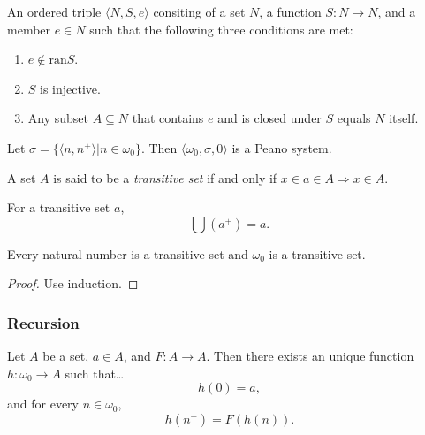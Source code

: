 \label{peanosystem}
An ordered triple $\langle N, S, e \rangle$ consiting of a set $N$, a function $S: N \rightarrow N$, and a member $e \in N$ such that the following three conditions are met:
\begin{enumerate}
  \item $e \not\in \textrm{ran} S$.
  \item $S$ is injective.
  \item Any subset $A \subseteq N$ that contains $e$ and is closed under $S$ equals $N$ itself.
\end{enumerate}

\begin{proposition}
Let $\sigma = \{\langle n, n^+ \rangle | n \in \omega_0\}$. Then $\langle \omega_0, \sigma, 0 \rangle$ is a Peano system.
\end{proposition}

\label{transitiveset}
A set $A$ is said to be a \emph{transitive set} if and only if $x \in a \in A \Rightarrow x \in A$.

\begin{proposition}
For a transitive set $a$,
$$\bigcup(a^+) = a.$$
\end{proposition}

\begin{proposition}
Every natural number is a transitive set and $\omega_0$ is a transitive set.
\end{proposition}

\begin{proof}
Use induction.
\end{proof}

\subsubsection{Recursion}\label{recursion}

\begin{theorem}
Let $A$ be a set, $a \in A$, and $F: A \rightarrow A.$ Then there exists an unique function $h: \omega_0 \rightarrow A$ such that\dots
$$h(0) = a,$$
and for every $n \in \omega_0$,
$$h(n^+) = F(h(n)).$$
\end{theorem}

